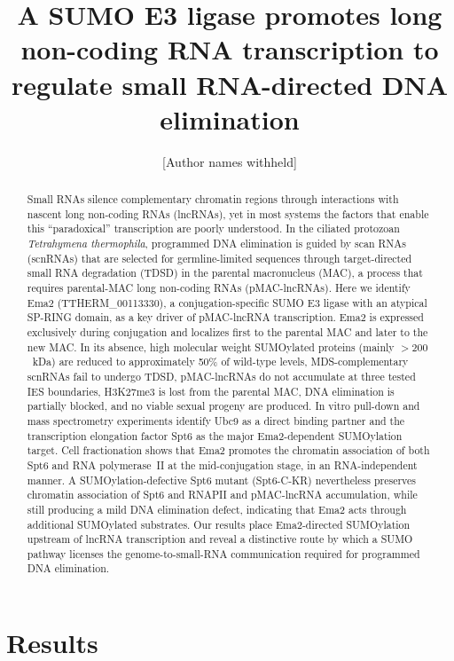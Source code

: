 \documentclass[11pt]{article}
\title{A SUMO E3 ligase promotes long non-coding RNA transcription to
regulate small RNA-directed DNA elimination}
\author{[Author names withheld]}
\date{}
\begin{document}
\maketitle

\begin{abstract}
Small RNAs silence complementary chromatin regions through interactions with
nascent long non-coding RNAs (lncRNAs), yet in most systems the factors that
enable this ``paradoxical'' transcription are poorly understood. In the
ciliated protozoan \emph{Tetrahymena thermophila}, programmed DNA elimination
is guided by scan RNAs (scnRNAs) that are selected for germline-limited
sequences through target-directed small RNA degradation (TDSD) in the
parental macronucleus (MAC), a process that requires parental-MAC long
non-coding RNAs (pMAC-lncRNAs). Here we identify Ema2 (TTHERM\_00113330), a
conjugation-specific SUMO E3 ligase with an atypical SP-RING domain, as a
key driver of pMAC-lncRNA transcription. Ema2 is expressed exclusively
during conjugation and localizes first to the parental MAC and later to
the new MAC. In its absence, high molecular weight SUMOylated proteins
(mainly $>\!200$~kDa) are reduced to approximately 50\% of wild-type levels,
MDS-complementary scnRNAs fail to undergo TDSD, pMAC-lncRNAs do not
accumulate at three tested IES boundaries, H3K27me3 is lost from the
parental MAC, DNA elimination is partially blocked, and no viable sexual
progeny are produced. In vitro pull-down and mass spectrometry experiments
identify Ubc9 as a direct binding partner and the transcription elongation
factor Spt6 as the major Ema2-dependent SUMOylation target. Cell
fractionation shows that Ema2 promotes the chromatin association of both
Spt6 and RNA polymerase~II at the mid-conjugation stage, in an RNA-independent
manner. A SUMOylation-defective Spt6 mutant (Spt6-C-KR) nevertheless
preserves chromatin association of Spt6 and RNAPII and pMAC-lncRNA
accumulation, while still producing a mild DNA elimination defect,
indicating that Ema2 acts through additional SUMOylated substrates. Our
results place Ema2-directed SUMOylation upstream of lncRNA transcription and
reveal a distinctive route by which a SUMO pathway licenses the
genome-to-small-RNA communication required for programmed DNA elimination.
\end{abstract}



\section{Results}
\end{document}
